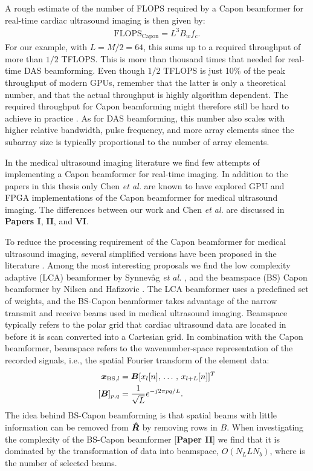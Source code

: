 A rough estimate of the number of FLOPS required by a Capon beamformer for real-time cardiac ultrasound imaging is then given by:
\begin{align}
\text{FLOPS}_{\text{Capon}} = L^3B_wf_c.
\end{align}
For our example, with $L=M/2=64$, this sums up to a required throughput of more than $1/2$ TFLOPS. This is more than thousand times that needed for real-time DAS beamforming. Even though $1/2$ TFLOPS is just 10\% of the peak throughput of modern GPUs, remember that the latter is only a theoretical number, and that the actual throughput is highly algorithm dependent. The required throughput for Capon beamforming might therefore still be hard to achieve in practice \cite[\textbf{Paper II}]{So2011}. As for DAS beamforming, this number also scales with higher relative bandwidth, pulse frequency, and more array elements since the subarray size is typically proportional to the number of array elements. 

In the medical ultrasound imaging literature we find few attempts of implementing a Capon beamformer for real-time imaging. In addition to the papers in this thesis only Chen \textit{et al.} \cite{Chen2011, Chen, Chen2011a} are known to have explored GPU and FPGA implementations of the Capon beamformer for medical ultrasound imaging. The differences between our work and Chen \textit{et al.} are discussed in \textbf{Papers I}, \textbf{II}, and \textbf{VI}.

To reduce the processing requirement of the Capon beamformer for medical ultrasound imaging, several simplified versions have been proposed in the literature \cite{Asl2012, Kim}. Among the most interesting proposals we find the low complexity adaptive (LCA) beamformer by Synnev\aa{}g \textit{et al.} \cite{Synnevag2011},  and the beamspace (BS) Capon beamformer by Nilsen and Hafizovic \cite{Nilsen2009}. The LCA beamformer uses a predefined set of weights, and the BS-Capon beamformer takes advantage of the narrow transmit and receive beams used in medical ultrasound imaging. Beamspace typically refers to the polar grid that cardiac ultrasound data are located in before it is scan converted into a Cartesian grid. In combination with the Capon beamformer, beamspace refers to the wavenumber-space representation of the recorded signals, i.e., the spatial Fourier transform of the element data: 
\begin{align}
\vec{x}_{\text{BS},l} &= \mat{B}[x_l[n],\,\dotso,\,x_{l+L}[n]]^T\\
[\mat{B}]_{p,q} &= \frac{1}{\sqrt{L}}e^{-j 2 \pi p q / L}.
\end{align}
The idea behind BS-Capon beamforming is that spatial beams with little information can be removed from $\boldsymbol{\hat{R}}$ by removing rows in $B$. When investigating the complexity of the BS-Capon beamformer [\textbf{Paper II}] we find that it is dominated by the transformation of data into beamspace, $O(N_LLN_b)$, where  is the number of selected beams. 

